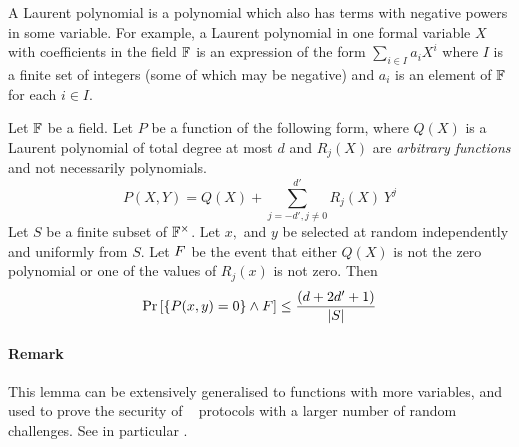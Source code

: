 A Laurent polynomial is a polynomial which also has terms with negative powers in some variable. For example, a Laurent polynomial in one formal variable $X$ with coefficients in the field $\mathbb{F}$ is an expression of the form $\sum_{i \in I} a_i X^i$ where $I$ is a finite set of integers (some of which may be negative) and $a_i$ is an element of $\mathbb{F}$ for each $i \in I$.

\begin{lemma}
\label{lem:szvariant}
Let $\mathbb{F}$ be a field. Let $P$ be a function of the following form, where $Q(X)$ is a Laurent polynomial of total degree at most $d$ and $R_j(X)$ are \emph{arbitrary functions} and not necessarily polynomials.
\[
P(X,Y) = Q(X) + \sum_{j=-d', j \neq 0}^{d'} R_{j}(X) \ Y^{j}
\]
Let $S$ be a finite subset of $\mathbb{F}^\times$. Let $x,$ and $y$ be selected at random independently and uniformly from $S$. Let $F$ be the event that either $Q(X)$ is not the zero polynomial or one of the values of $R_j(x)$ is not zero. Then
\[
\Pr \left[ \lbrace P(x,y) = 0 \rbrace \wedge F \right] \leq \frac{(d+2d'+1)}{|S|}
\]
\end{lemma}
\paragraph{Remark} This lemma can be extensively generalised to functions with more variables, and used to prove the security of \ILC~ protocols with a larger number of random challenges. See in particular \cite{BootleCGGHJ17}.


